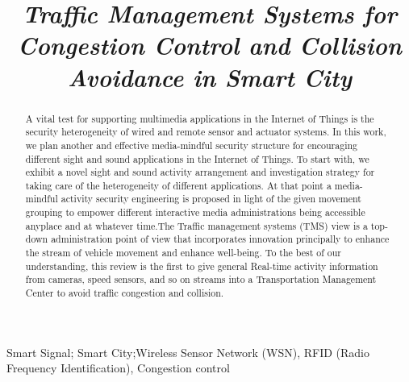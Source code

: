 \documentclass[conference]{IEEEtran}
\begin{document}
\title{\textbf{\textit{Traffic Management Systems for Congestion Control and Collision Avoidance
in Smart City}}}

\author{
\and
{}
}

\maketitle

\begin{abstract}
A vital test for supporting multimedia applications in the Internet of Things is the security heterogeneity of wired and remote sensor and actuator systems. In this work, we plan another and effective media-mindful security structure for encouraging different sight and sound applications in the Internet of Things. To start with, we exhibit a novel sight and sound activity arrangement and investigation strategy for taking care of the heterogeneity of different applications. At that point a media-mindful activity security engineering is proposed in light of the given movement grouping to empower different interactive media administrations being accessible anyplace and at whatever time.The Traffic management systems (TMS) view is a top-down administration point of view that incorporates innovation principally to enhance the stream of vehicle movement and enhance well-being. To the best of our understanding, this review is the first to give general Real-time activity information from cameras, speed sensors, and so on streams into a Transportation Management Center to avoid traffic congestion and collision.
\end{abstract}

\begin{IEEEkeywords}
Smart Signal; Smart City;Wireless Sensor Network (WSN), RFID (Radio Frequency
Identification), Congestion control
\end{IEEEkeywords}

\IEEEpeerreviewmaketitle
\end{document}
